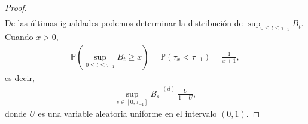\begin{proof}
\begin{align*}
\end{align*}
De las últimas igualdades podemos determinar la distribución de $\sup_{0 \leq t \leq \tau_{-1}} B_t$. Cuando $x > 0$, 
\begin{align*}
\mathbb{P} \left( \sup_{0 \leq t \leq \tau_{-1}} B_t \geq x \right) = \mathbb{P} \left( \tau_x < \tau_{-1} \right) = \frac{1}{x+1},
\end{align*}
es decir, 
\begin{align*}
\sup_{s \in [0, \tau_{-1}]} B_s \stackrel{(d)}{=} \frac{U}{1 - U},
\end{align*}
donde $U$ es una variable aleatoria uniforme en el intervalo $(0, 1)$.
\end{proof}











